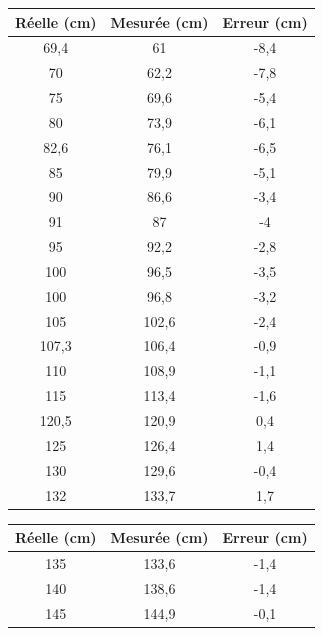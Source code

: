 \documentclass[11pt,a4paper]{article}
\begin{document}
\begin{table}[H]
    \centering
    \small
    \begin{minipage}[t]{0.48\textwidth}
        \vspace{0pt}
        \centering
        \begin{tabular}{|c|c|c|}
        \hline
        Réelle (cm) & Mesurée (cm) & Erreur (cm) \\ \hline
        69,4  & 61    & -8,4 \\ \hline
        70    & 62,2  & -7,8 \\ \hline
        75    & 69,6  & -5,4 \\ \hline
        80    & 73,9  & -6,1 \\ \hline
        82,6  & 76,1  & -6,5 \\ \hline
        85    & 79,9  & -5,1 \\ \hline
        90    & 86,6  & -3,4 \\ \hline
        91    & 87    & -4   \\ \hline
        95    & 92,2  & -2,8 \\ \hline
        100   & 96,5  & -3,5 \\ \hline
        100   & 96,8  & -3,2 \\ \hline
        105   & 102,6 & -2,4 \\ \hline
        107,3 & 106,4 & -0,9 \\ \hline
        110   & 108,9 & -1,1 \\ \hline
        115   & 113,4 & -1,6 \\ \hline
        120,5 & 120,9 & 0,4  \\ \hline
        125   & 126,4 & 1,4  \\ \hline
        130   & 129,6 & -0,4 \\ \hline
        132   & 133,7 & 1,7  \\ \hline
        \end{tabular}
    \end{minipage}
    \hfill
    \begin{minipage}[t]{0.48\textwidth}
        \vspace{0pt}
        \centering
        \begin{tabular}{|c|c|c|}
        \hline
        Réelle (cm) & Mesurée (cm) & Erreur (cm) \\ \hline
        135   & 133,6 & -1,4 \\ \hline
        140   & 138,6 & -1,4 \\ \hline
        145   & 144,9 & -0,1 \\ \hline

\end{tabular}
\end{minipage}
\end{table}
\end{document}

